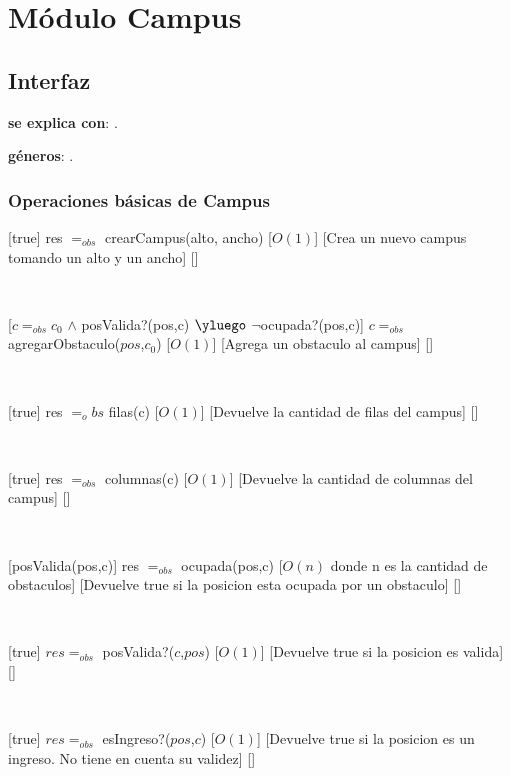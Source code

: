 \section{Módulo Campus}

\subsection{Interfaz}

\textbf{se explica con}: .

\textbf{géneros}: .

\subsubsection{Operaciones básicas de Campus}

[true]
{res $=_{obs}$ crearCampus(alto, ancho)}
[$O(1)$]
[Crea un nuevo campus tomando un alto y un ancho]
[]

~

[$c =_{obs} c_0$ $\land$ posValida?(pos,c) $\yluego$ $\neg$ocupada?(pos,c)]
{$c =_{obs}$ agregarObstaculo($pos$,$c_0$)}
[$O(1)$]
[Agrega un obstaculo al campus]
[]

~

[true]
{res $=_obs$ filas(c)}
[$O(1)$]
[Devuelve la cantidad de filas del campus]
[]

~

[true]
{res $=_{obs}$ columnas(c)}
[$O(1)$]
[Devuelve la cantidad de columnas del campus]
[]

~


[posValida(pos,c)]
{res $=_{obs}$ ocupada(pos,c)}
[$O(n)$ donde n es la cantidad de obstaculos]
[Devuelve true si la posicion esta ocupada por un obstaculo]
[]

~

[true]
{$res =_{obs}$ posValida?($c$,$pos$)}
[$O(1)$]
[Devuelve true si la posicion es valida]
[]

~

[true]
{$res =_{obs}$ esIngreso?($pos$,$c$)}
[$O(1)$]
[Devuelve true si la posicion es un ingreso. No tiene en cuenta su validez]
[]

